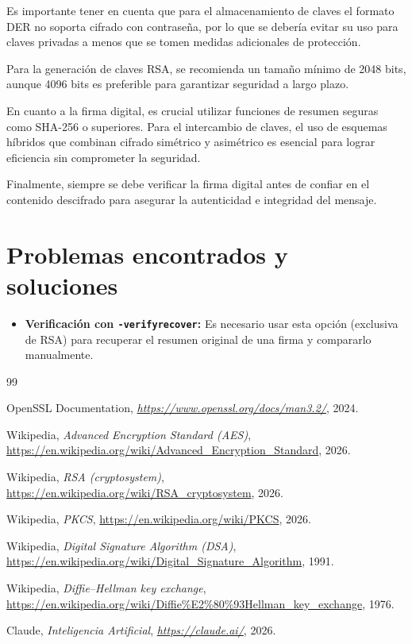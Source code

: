 \documentclass[12pt,a4paper]{report}
\begin{document}
Es importante tener en cuenta que para el almacenamiento de claves el formato DER no soporta cifrado con contraseña, por lo que se debería evitar su uso para claves privadas a menos que se tomen medidas adicionales de protección.

Para la generación de claves RSA, se recomienda un tamaño mínimo de 2048 bits, aunque 4096 bits es preferible para garantizar seguridad a largo plazo.

En cuanto a la firma digital, es crucial utilizar funciones de resumen seguras como SHA-256 o superiores. Para el intercambio de claves, el uso de esquemas híbridos que combinan cifrado simétrico y asimétrico es esencial para lograr eficiencia sin comprometer la seguridad.

Finalmente, siempre se debe verificar la firma digital antes de confiar en el contenido descifrado para asegurar la autenticidad e integridad del mensaje.

\section{Problemas encontrados y soluciones}

\begin{itemize}[label=\textbullet]
    \item \textbf{Verificación con \texttt{-verifyrecover}:} Es necesario usar 
    esta opción (exclusiva de RSA) para recuperar el resumen original de una firma
     y compararlo manualmente.
\end{itemize}


\begin{thebibliography}{99}

 OpenSSL Documentation, \textit{\url{https://www.openssl.org/docs/man3.2/}}, 2024.

 Wikipedia, \textit{Advanced Encryption Standard (AES)}, \url{https://en.wikipedia.org/wiki/Advanced_Encryption_Standard}, 2026.

 Wikipedia, \textit{RSA (cryptosystem)}, \url{https://en.wikipedia.org/wiki/RSA_cryptosystem}, 2026.

 Wikipedia, \textit{PKCS}, \url{https://en.wikipedia.org/wiki/PKCS}, 2026.

 Wikipedia, \textit{Digital Signature Algorithm (DSA)}, \url{https://en.wikipedia.org/wiki/Digital_Signature_Algorithm}, 1991.

 Wikipedia, \textit{Diffie–Hellman key exchange}, \url{https://en.wikipedia.org/wiki/Diffie%E2%80%93Hellman_key_exchange}, 1976.

 Claude, \textit{Inteligencia Artificial}, \textit{\url{https://claude.ai/}}, 2026.

\end{thebibliography}
\end{document}

